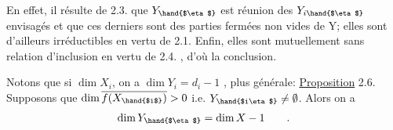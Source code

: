En effet, il résulte de 2.3. que  $Y_{\hand{$\eta$}}$ est réunion des $Y_{i\hand{$\eta$}}$ envisagés
et que ces derniers sont des parties fermées non vides de Y; elles sont
d'ailleurs irréductibles en vertu de 2.1. Enfin, elles sont mutuellement
sans relation d'inclusion en vertu de 2.4. , d'où la conclusion.

Notons que si  $\dim X_i$,  on a $\dim Y_i = d_i-1$ ,  plus générale:
\uline{Proposition} 2.6. Supposons que  $\dim \overline{f(X_{\hand{$i$}})} > 0$ i.e. $Y_{\hand{$i\eta$}} \neq \emptyset$. Alors on a
\[ \dim Y_{\hand{$\eta$}} = \dim X - 1 \qquad . \]


